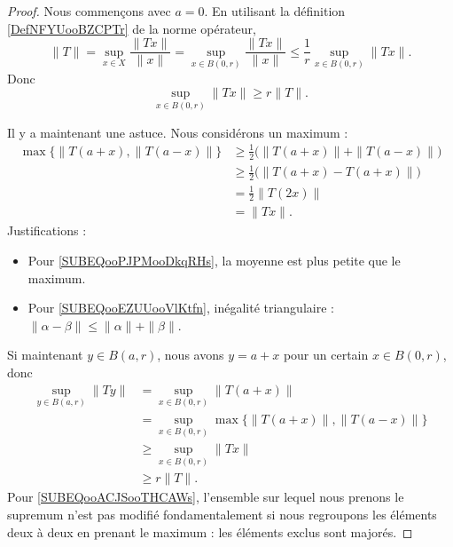 \begin{proof}
	Nous commençons avec \( a=0\). En utilisant la définition \ref{DefNFYUooBZCPTr} de la norme opérateur,
	\begin{equation}
		\| T \|=\sup_{x\in X}\frac{ \| Tx \| }{ \| x \| }=\sup_{x\in B(0,r)}\frac{ \| Tx \| }{ \| x \| }\leq \frac{1}{ r }\sup_{x\in B(0,r)}\| Tx \|.
	\end{equation}
	Donc
	\begin{equation}
		\sup_{x\in B(0,r)}\| Tx \|\geq r\| T \|.
	\end{equation}

	Il y a maintenant une astuce. Nous considérons un maximum :
	\begin{subequations}
		\begin{align}
			\max\{ \| T(a+x),\| T(a-x) \|  \} & \geq \frac{ 1 }{2}\big( \| T(a+x) \|+\| T(a-x) \| \big) \label{SUBEQooPJPMooDkqRHs} \\
			                                  & \geq \frac{ 1 }{2}\big( \| T(a+x)-T(a+x) \| \big)      \label{SUBEQooEZUUooVlKtfn}  \\
			                                  & =\frac{ 1 }{2}\| T(2x) \|                                                           \\
			                                  & =\| Tx \|.
		\end{align}
	\end{subequations}
	Justifications :
	\begin{itemize}
		\item Pour \eqref{SUBEQooPJPMooDkqRHs}, la moyenne est plus petite que le maximum.
		\item Pour \eqref{SUBEQooEZUUooVlKtfn}, inégalité triangulaire : \( \| \alpha-\beta \|\leq \| \alpha \|+\| \beta \|\).
	\end{itemize}
	Si maintenant \( y\in B(a,r)\), nous avons \( y=a+x\) pour un certain \( x\in B(0,r)\), donc
	\begin{subequations}
		\begin{align}
			\sup_{y\in B(a,r)}\| Ty \| & =\sup_{x\in B(0,r)}\| T(a+x) \|                                                            \\
			                           & =\sup_{x\in B(0,r)}\max\{ \| T(a+x) \|, \| T(a-x) \| \}        \label{SUBEQooACJSooTHCAWs} \\
			                           & \geq \sup_{x\in B(0,r)}\| Tx \|                                                            \\
			                           & \geq r\| T \|.
		\end{align}
	\end{subequations}
	Pour \eqref{SUBEQooACJSooTHCAWs}, l'ensemble sur lequel nous prenons le supremum n'est pas modifié fondamentalement si nous regroupons les éléments deux à deux en prenant le maximum : les éléments exclus sont majorés.
\end{proof}

